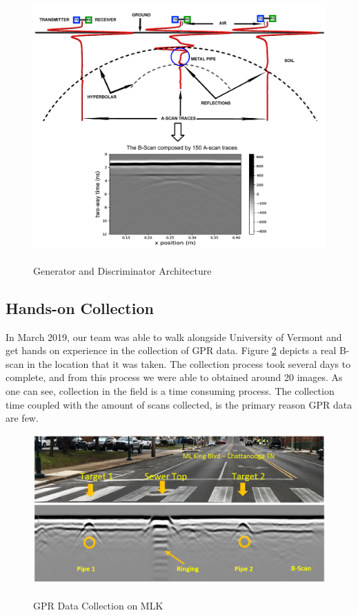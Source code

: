 \begin{figure}[H]
  \centering
  \includegraphics[width=1.0\linewidth]{figures/GPR_Original.png}
  \caption{\\Generator and Discriminator Architecture}
  \label{fig:gpr_basics}
\end{figure}

\subsection{Hands-on Collection}
 \hspace{0.5in}In March 2019, our team was able to walk alongside University of Vermont and get hands on experience in the collection of GPR data. Figure \ref{fig:mlk_collection} depicts a real B-scan in the location that it was taken. The collection process took several days to complete, and from this process we were able to obtained around 20 images. As one can see, collection in the field is a time consuming process. The collection time coupled with the amount of scans collected, is the primary reason GPR data are few.
 \vspace{0.5\baselineskip}

\begin{figure}[H]
    \centering
    \includegraphics[width=\linewidth]{figures/mlk_collection.png}
    \caption{\\GPR Data Collection on MLK}
    \label{fig:mlk_collection}
\end{figure}


